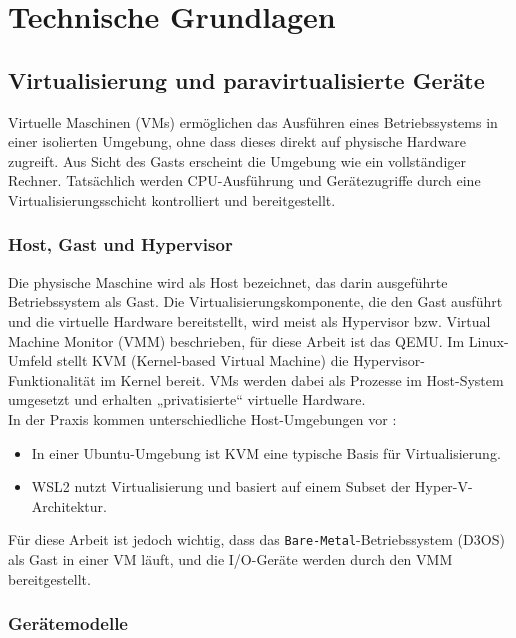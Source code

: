 \chapter{Technische Grundlagen}

\section{Virtualisierung und paravirtualisierte Geräte}

Virtuelle Maschinen (VMs) ermöglichen das Ausführen eines Betriebssystems in einer isolierten Umgebung, ohne dass dieses direkt auf physische Hardware zugreift. Aus Sicht des Gasts erscheint die Umgebung wie ein vollständiger Rechner. Tatsächlich werden CPU-Ausführung und Gerätezugriffe durch eine Virtualisierungsschicht kontrolliert und bereitgestellt.

\subsection{Host, Gast und Hypervisor}

Die physische Maschine wird als Host bezeichnet, das darin ausgeführte Betriebssystem als Gast. Die Virtualisierungskomponente, die den Gast ausführt und die virtuelle Hardware bereitstellt, wird meist als Hypervisor bzw. Virtual Machine Monitor (VMM) beschrieben, für diese Arbeit ist das QEMU. Im Linux-Umfeld stellt KVM (Kernel-based Virtual Machine) die Hypervisor-Funktionalität im Kernel bereit. VMs werden dabei als Prozesse im Host-System umgesetzt und erhalten „privatisierte“ virtuelle Hardware.\\

In der Praxis kommen unterschiedliche Host-Umgebungen vor \cite{ibm_hypervisor_2024}:

\begin{itemize}
 \item In einer Ubuntu-Umgebung ist KVM eine typische Basis für Virtualisierung.
 \item WSL2 nutzt Virtualisierung und basiert auf einem Subset der Hyper-V-Architektur.
\end{itemize}

Für diese Arbeit ist jedoch wichtig, dass das \texttt{Bare-Metal}-Betriebssystem (D3OS) als Gast in einer VM läuft, und die I/O-Geräte werden durch den VMM bereitgestellt.

\subsection{Gerätemodelle}

